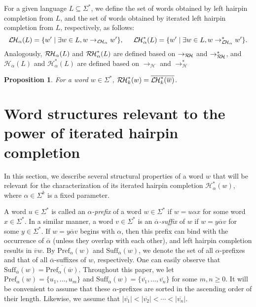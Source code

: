 \documentclass{article}
\theoremstyle{plain}
\newtheorem{proposition}{Proposition}
\theoremstyle{remark}
\newcommand{\LHC}{\ensuremath{\mathcal{L\hspace*{-0.5mm}H}}}
\newcommand{\RHC}{\ensuremath{\mathcal{R\hspace*{-0.5mm}H}}}
\newcommand{\HC}{\ensuremath{\mathcal{H}}}
\newcommand{\Pref}{\ensuremath{\mathrm{Pref}}}
\newcommand{\Suff}{\ensuremath{\mathrm{Suff}}}
\newcommand{\calpha}{\ensuremath{\overline{\alpha}}}
\begin{document}
For a given language $L \subseteq \Sigma^*$, we define the set of words obtained by left hairpin completion from $L$, and the set of words obtained by iterated left hairpin completion from $L$, respectively, as follows: 
\[
	\LHC_\alpha(L) = \{w' \mid \exists w \in L, w \to_{\LHC_\alpha} w'\}, \hspace*{5mm} \LHC_\alpha^*(L) = \{w' \mid \exists w \in L, w \to_{\LHC_\alpha}^* w'\}. 
\]
Analogously, $\RHC_\alpha(L)$ and $\RHC_\alpha^*(L)$ are defined based on $\to_{\RHC}$ and $\to_{\RHC}^*$, and $\HC_\alpha(L)$ and $\HC_\alpha^*(L)$ are defined based on $\to_{\HC}$ and $\to_{\HC}^*$

\begin{proposition}\label{prop:presentation_RH}
	For a word $w \in \Sigma^*$, $\RHC_k^*(w) = \overline{\LHC_k^*(\overline{w})}$. 
\end{proposition}


\section{Word structures relevant to the power of iterated hairpin completion}
	\label{sec:apref_casuf}

In this section, we describe several structural properties of a word $w$ that will be relevant for the characterization of its iterated hairpin completion $\HC_\alpha^*(w)$, where $\alpha \in \Sigma^k$ is a fixed parameter. 

A word $u \in \Sigma^*$ is called an {\it $\alpha$-prefix} of a word $w \in \Sigma^*$ if $w = u\alpha x$ for some word $x \in \Sigma^*$. 
In a similar manner, a word $v \in \Sigma^*$ is an {\it $\overline{\alpha}$-suffix} of $w$ if $w = y\overline{\alpha} v$ for some $y \in \Sigma^*$. 
If $w = y \overline{\alpha} v$ begins with $\alpha$, then this prefix can bind with the occurrence of $\overline{\alpha}$ (unless they overlap with each other), and left hairpin completion results in $\overline{v}w$. 
By $\Pref_\alpha(w)$ and $\Suff_{\overline{\alpha}}(w)$, we denote the set of all $\alpha$-prefixes and that of all $\overline{\alpha}$-suffixes of $w$, respectively. 
One can easily observe that $\Suff_{\calpha}(w) = \overline{\Pref_\alpha(\overline{w})}$. 
Throughout this paper, we let $\Pref_\alpha(w) = \{u_1, \ldots, u_m\}$ and $\Suff_{\calpha}(w) = \{\overline{v_1}, \ldots, \overline{v_n}\}$ for some $m, n \ge 0$. 
It will be convenient to assume that these $\alpha$-prefixes are sorted in the ascending order of their length. 
Likewise, we assume that $|\overline{v_1}| < |\overline{v_2}| < \cdots < |\overline{v_n}|$. 
\end{document}
